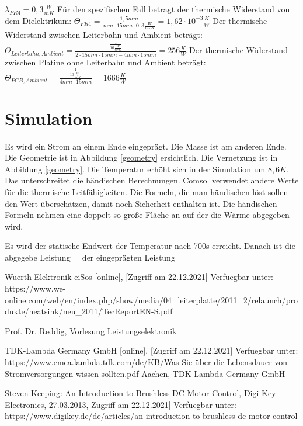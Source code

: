 \documentclass[10pt,a4paper,oneside,abstracton]{scrartcl}
\begin{document}
\begin{multicols}{2}
 $\lambda_{FR4} = 0,3 \frac{W}{m K}$ \cite{Waermefluss} \newline
Für den spezifischen Fall betragt der thermische Widerstand von dem Dielektrikum: \newline
$\Theta_{FR4} = \frac{1,5 mm}{mm \cdot 15mm \cdot 0,3 \frac{W}{m\cdot K}} = 1,62\cdot 10^{-3} \frac{K}{W}$
Der thermische Widerstand zwischen Leiterbahn und Ambient beträgt: 
$\Theta_{Leiterbahn, Ambient} = \frac{\frac{1}{10 \frac{W}{m^2K}}}{ 2\cdot 15mm \cdot 15mm - 4mm \cdot 15mm} = 256 \frac{K}{W} $
Der thermische Widerstand zwischen Platine ohne Leiterbahn und Ambient beträgt: 
$\Theta_{PCB, Ambient} = \frac{\frac{1}{10 \frac{W}{m^2K}}}{  4mm \cdot 15mm} = 1666 \frac{K}{W} $

\section{Simulation}
Es wird ein Strom an einem Ende eingeprägt. Die Masse ist am anderen Ende. 
Die Geometrie ist in Abbildung \ref*{geometry} ersichtlich. Die Vernetzung ist in Abbildung \ref*{geometry}. 
Die Temperatur erhöht sich in der Simulation um $8,6 K$. 
Das unterschreitet die  händischen Berechnungen. Comsol verwendet andere Werte für die thermische Leitfähigkeiten.
Die Formeln, die man händischen löst sollen den Wert überschätzen, damit noch Sicherheit enthalten ist. 
Die händischen Formeln nehmen eine doppelt so große Fläche an auf der die Wärme abgegeben wird. 

Es wird der statische Endwert der Temperatur nach 700s erreicht. Danach ist die abgegebe Leistung = der eingeprägten Leistung


\begin{thebibliography}{9}

Wuerth Elektronik eiSos  [online], [Zugriff am 22.12.2021] Verfuegbar unter: https://www.we-online.com/web/en/index.php/show/media/04\_leiterplatte/2011\_2/relaunch/produkte/heatsink/neu\_2011/TecReport\-EN-S.pdf

Prof. Dr. Reddig, Vorlesung Leistungselektronik

TDK-Lambda Germany GmbH [online], [Zugriff am 22.12.2021] Verfuegbar unter:	https://www.emea.lambda.tdk.com/de/KB/Was-Sie-über-die-Lebensdauer-von-Stromversorgungen-wissen-sollten.pdf
Aachen, TDK-Lambda Germany GmbH



Steven Keeping: An Introduction to Brushless DC Motor Control, Digi-Key Electronics, 27.03.2013, Zugriff am 22.12.2021] Verfuegbar unter: https://www.digikey.de/de/articles/an-introduction-to-brushless-dc-motor-control


\end{thebibliography}
\end{multicols}
\end{document}
